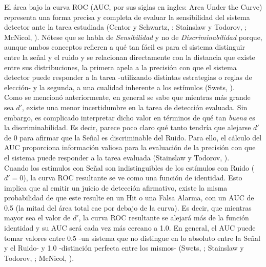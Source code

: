 El área bajo la curva ROC (AUC, por sus siglas en ingles: Area Under the Curve) representa una forma precisa y completa de evaluar la sensibilidad del sistema detector ante la tarea estudiada (Centor y Schwartz, \citeyear{Centor1985}; Stainslaw y Todorov, \citeyear{Stainslaw1999}; McNicol, \citeyear{McNicol5}). Nótese que se habla de \textit{Sensibilidad} y no de \textit{Discriminabilidad} porque, aunque ambos conceptos refieren a qué tan fácil es para el sistema distinguir entre la señal y el ruido y se relacionan directamente con la distancia que existe entre sus distribuciones, la primera apela a la precisión con que el sistema detector puede responder a la tarea -utilizando distintas estrategias o reglas de elección- y la segunda, a una cualidad inherente a los estímulos (Swets, \citeyear{Swets1973}).\\

Como se mencionó anteriormente, en general se sabe que mientras más grande sea $d'$, existe una menor incertidumbre en la tarea de detección evaluada. Sin embargo, es complicado interpretar dicho valor en términos de qué tan \textit{buena} es la discriminabilidad. Es decir, parece poco claro qué tanto tendría que alejarse $d'$ de $0$ para afirmar que la Señal es discriminable del Ruido. Para ello, el cálculo del AUC proporciona información valiosa para la evaluación de la precisión con que el sistema puede responder a la tarea evaluada (Stainslaw y Todorov, \citeyear{Stainslaw1999}).\\ 

Cuando los estímulos con Señal son indistinguibles de los estímulos con Ruido ($d' = 0$), la curva ROC resultante se ve como una función de identidad. Esto implica que al emitir un juicio de detección afirmativo, existe la misma probabilidad de que este resulte en un Hit o una Falsa Alarma, con un AUC de 0.5 (la mitad del área total cae por debajo de la curva). Es decir, que mientras mayor sea el valor de $d'$, la curva ROC resultante se alejará más de la función identidad y su AUC será cada vez más cercano a 1.0. En general, el AUC puede tomar valores entre 0.5 -un sistema que no distingue en lo absoluto entre la Señal y el Ruido- y 1.0 -distinción perfecta entre los mismos- (Swets, \citeyear{Swets1973}; Stainslaw y Todorov, \citeyear{Stainslaw1999}; McNicol, \citeyear{McNicol5}).\\

